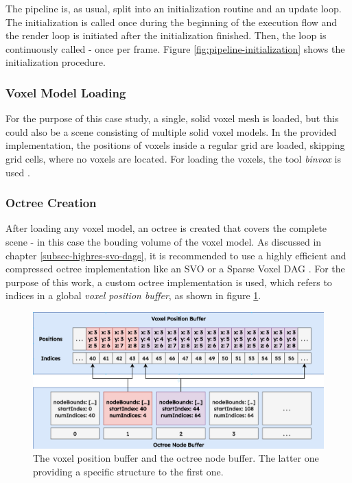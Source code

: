 \noindent
The pipeline is, as usual, split into an initialization routine and an update loop. The initialization is 
called once during the beginning of the execution flow and the render loop is initiated after the initialization 
finished. Then, the loop is continuously called - once per frame. Figure \ref{fig:pipeline-initialization} shows 
the initialization procedure. 

\subsubsection*{Voxel Model Loading} \label{subsec-voxel-model-loading}

For the purpose of this case study, a single, solid voxel mesh is loaded, but this could also be a scene 
consisting of multiple solid voxel models. In the provided implementation, the positions of voxels inside a regular 
grid are loaded, skipping grid cells, where no voxels are located. For loading the voxels, the tool \emph{binvox} 
is used \cite{binvox, Nooruddin2003}. 


\subsubsection*{Octree Creation} \label{subsec-octree-creation}

After loading any voxel model, an octree is created that covers the complete scene - in this case the bouding 
volume of the voxel model. As discussed in chapter \ref{subsec-highres-svo-dags}, it is recommended to use a 
highly efficient and compressed octree implementation like an \ac{SVO} or a Sparse Voxel \ac{DAG} \cite{Kampe2013}. 
For the purpose of this work, a custom octree implementation is used, which refers to indices in a global 
\emph{voxel position buffer}, as shown in figure \ref{fig:voxelpos-octreenode-buffer}.\\

\begin{figure}[h]
    \centering
    \includegraphics[width=\linewidth]{images/graphics/voxelpos-octreenode-buffer.jpg}
    \caption{The voxel position buffer and the octree node buffer. The latter one providing a 
    specific structure to the first one.}
    \label{fig:voxelpos-octreenode-buffer}
\end{figure}

